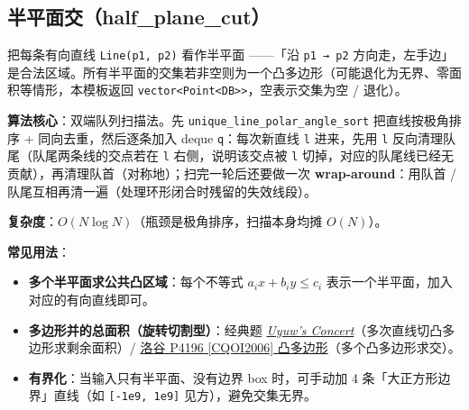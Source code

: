 		\subsection{半平面交（half\_plane\_cut）}

		把每条有向直线 \texttt{Line(p1, p2)} 看作半平面 ——「沿 \texttt{p1 → p2} 方向走，左手边」是合法区域。所有半平面的交集若非空则为一个凸多边形（可能退化为无界、零面积等情形，本模板返回 \texttt{vector<Point<DB>>}，空表示交集为空 / 退化）。

		\textbf{算法核心}：双端队列扫描法。先 \texttt{unique\_line\_polar\_angle\_sort} 把直线按极角排序 + 同向去重，然后逐条加入 deque \texttt{q}：每次新直线 \texttt{l} 进来，先用 \texttt{l} 反向清理队尾（队尾两条线的交点若在 \texttt{l} 右侧，说明该交点被 \texttt{l} 切掉，对应的队尾线已经无贡献），再清理队首（对称地）；扫完一轮后还要做一次 \textbf{wrap-around}：用队首 / 队尾互相再清一遍（处理环形闭合时残留的失效线段）。

		\textbf{复杂度}：$O(N \log N)$（瓶颈是极角排序，扫描本身均摊 $O(N)$）。

		\textbf{常见用法}：
		\begin{itemize}
			\item \textbf{多个半平面求公共凸区域}：每个不等式 $a_i x + b_i y \le c_i$ 表示一个半平面，加入对应的有向直线即可。
			\item \textbf{多边形并的总面积（旋转切割型）}：经典题 \href{https://vjudge.net/problem/OpenJ_Bailian-2451}{\emph{Uyuw's Concert}}（多次直线切凸多边形求剩余面积）/ \href{https://www.luogu.com.cn/problem/P4196}{洛谷 P4196 [CQOI2006] 凸多边形}（多个凸多边形求交）。
			\item \textbf{有界化}：当输入只有半平面、没有边界 box 时，可手动加 4 条「大正方形边界」直线（如 \texttt{[-1e9, 1e9]} 见方），避免交集无界。
		\end{itemize}

